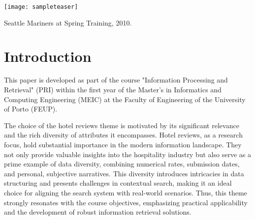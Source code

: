 \documentclass[sigconf]{acmart}
\begin{document}



\begin{teaserfigure}
  \texttt{[image: sampleteaser]}
  \caption{Seattle Mariners at Spring Training, 2010.}
  \label{fig:teaser}
\end{teaserfigure}


\maketitle

\section{Introduction}
This paper is developed as part of the course "Information Processing and Retrieval" (PRI) within the first year of the Master's in Informatics and Computing Engineering (MEIC) at the Faculty of Engineering of the University of Porto (FEUP).

The choice of the hotel reviews theme is motivated by its significant relevance and the rich diversity of attributes it encompasses. Hotel reviews, as a research focus, hold substantial importance in the modern information landscape. They not only provide valuable insights into the hospitality industry but also serve as a prime example of data diversity, combining numerical rates, submission dates, and personal, subjective narratives. This diversity introduces intricacies in data structuring and presents challenges in contextual search, making it an ideal choice for aligning the search system with real-world scenarios. Thus, this theme strongly resonates with the course objectives, emphasizing practical applicability and the development of robust information retrieval solutions.
\end{document}
